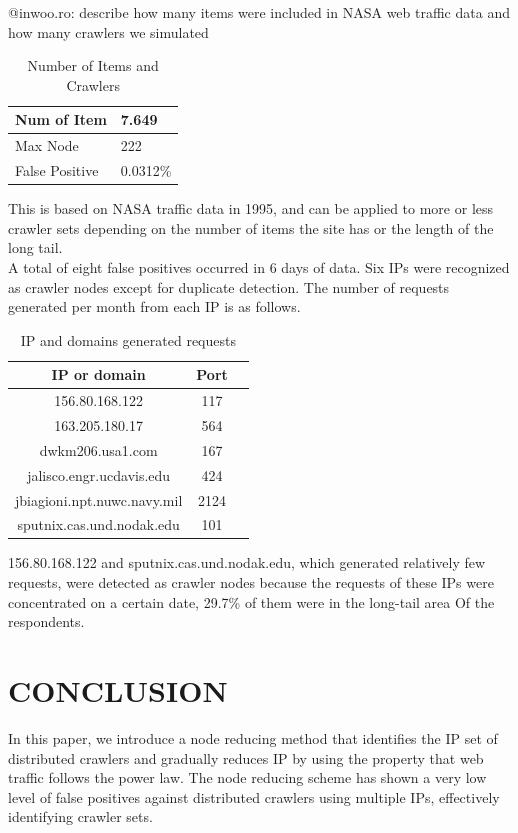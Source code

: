 \documentclass[sigconf,anonymous=false]{acmart}
\begin{document}
\begin{enumerate}
@inwoo.ro: describe how many items were included in NASA web traffic data and how many crawlers we simulated

\begin{table}[H]
  \caption{Number of Items and Crawlers}
  \label{tab:freq}
    \begin{tabular}{| p{2cm} | p{2cm} |}
    \hline
    Num of Item & 7.649 \\ \hline
    Max Node & 222 \\ \hline
    False Positive & 0.0312\%  \\ \hline
    \end{tabular}
\end{table}

This is based on NASA traffic data in 1995, and can be applied to more or less crawler sets depending on the number of items the site has or the length of the long tail. \\
A total of eight false positives occurred in 6 days of data. Six IPs were recognized as crawler nodes except for duplicate detection. The number of requests generated per month from each IP is as follows.


\begin{table}[H]
  \caption{IP and domains generated requests}
  \label{tab:freq}
  \begin{tabular}{ccl}
    \toprule
    IP or domain&Port\\
    \midrule
    156.80.168.122 & 117\\
    163.205.180.17 & 564\\
    dwkm206.usa1.com & 167\\
    jalisco.engr.ucdavis.edu & 424\\
    jbiagioni.npt.nuwc.navy.mil & 2124\\
    sputnix.cas.und.nodak.edu & 101\\
  \bottomrule
\end{tabular}
\end{table}


156.80.168.122 and sputnix.cas.und.nodak.edu, which generated relatively few requests, were detected as crawler nodes because the requests of these IPs were concentrated on a certain date, 29.7\% of them were in the long-tail area Of the respondents.

\end{enumerate}



%
%
\section{CONCLUSION}
In this paper, we introduce a node reducing method that identifies the IP set of distributed crawlers and gradually reduces IP by using the property that web traffic follows the power law.
The node reducing scheme has shown a very low level of false positives against distributed crawlers using multiple IPs, effectively identifying crawler sets.
\end{document}
